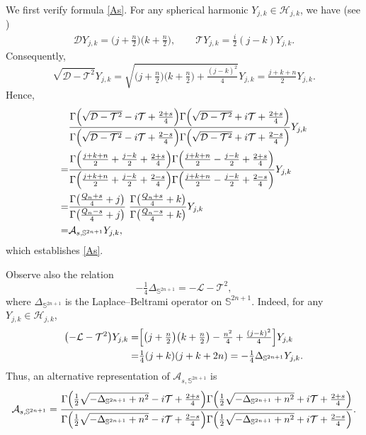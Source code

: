 \documentclass[12pt,reqno]{amsart}%
\theoremstyle{plain}
\numberwithin{equation}{section}
\begin{document}
We first verify formula \eqref{As}. For any spherical harmonic \(Y_{j,k} \in \mathcal{H}_{j,k}\), we have (see \cite{st,br1})
\begin{align*}
\mathcal{D} Y_{j,k} = \bigl(j + \tfrac{n}{2}\bigr)\bigl(k + \tfrac{n}{2}\bigr), \qquad
\mathcal{T} Y_{j,k} = \tfrac{i}{2}(j - k) Y_{j,k}.
\end{align*}
Consequently,
\[
\sqrt{\mathcal{D} - \mathcal{T}^{2}}  Y_{j,k}
= \sqrt{\bigl(j + \tfrac{n}{2}\bigr)\bigl(k + \tfrac{n}{2}\bigr) + \tfrac{(j-k)^{2}}{4}}  Y_{j,k}
= \tfrac{j + k + n}{2}  Y_{j,k}.
\]
Hence,
\begin{align*}
& \frac{\Gamma\Bigl(\sqrt{\mathcal{D} - \mathcal{T}^{2}} - i\mathcal{T} + \tfrac{2+s}{4}\Bigr)
      \Gamma\Bigl(\sqrt{\mathcal{D} - \mathcal{T}^{2}} + i\mathcal{T} + \tfrac{2+s}{4}\Bigr)}
     {\Gamma\Bigl(\sqrt{\mathcal{D} - \mathcal{T}^{2}} - i\mathcal{T} + \tfrac{2-s}{4}\Bigr)
      \Gamma\Bigl(\sqrt{\mathcal{D} - \mathcal{T}^{2}} + i\mathcal{T} + \tfrac{2-s}{4}\Bigr)}  Y_{j,k} \\
=& \frac{\Gamma\Bigl(\tfrac{j+k+n}{2} + \tfrac{j-k}{2} + \tfrac{2+s}{4}\Bigr)
      \Gamma\Bigl(\tfrac{j+k+n}{2} - \tfrac{j-k}{2} + \tfrac{2+s}{4}\Bigr)}
     {\Gamma\Bigl(\tfrac{j+k+n}{2} + \tfrac{j-k}{2} + \tfrac{2-s}{4}\Bigr)
      \Gamma\Bigl(\tfrac{j+k+n}{2} - \tfrac{j-k}{2} + \tfrac{2-s}{4}\Bigr)}  Y_{j,k} \\
=& \frac{\Gamma\bigl(\tfrac{Q_n+s}{4} + j\bigr)}{\Gamma\bigl(\tfrac{Q_n-s}{4} + j\bigr)}\;
   \frac{\Gamma\bigl(\tfrac{Q_n+s}{4} + k\bigr)}{\Gamma\bigl(\tfrac{Q_n-s}{4} + k\bigr)}
   Y_{j,k} \\
=& \mathcal{A}_{s,\mathbb{S}^{2n+1}} Y_{j,k},
\end{align*}
which establishes \eqref{As}.

Observe also the relation
\[
-\tfrac{1}{4}\Delta_{\mathbb{S}^{2n+1}} = -\mathcal{L} - \mathcal{T}^{2},
\]
where \(\Delta_{\mathbb{S}^{2n+1}}\) is the Laplace--Beltrami operator on \(\mathbb{S}^{2n+1}\). Indeed, for any \(Y_{j,k} \in \mathcal{H}_{j,k}\),
\begin{align*}
\bigl(-\mathcal{L} - \mathcal{T}^{2}\bigr) Y_{j,k}
=& \Bigl[\bigl(j + \tfrac{n}{2}\bigr)\bigl(k + \tfrac{n}{2}\bigr) - \tfrac{n^{2}}{4} + \tfrac{(j-k)^{2}}{4}\Bigr] Y_{j,k} \\
=& \tfrac{1}{4}(j+k)(j+k+2n) = -\tfrac{1}{4}\Delta_{\mathbb{S}^{2n+1}} Y_{j,k}.
\end{align*}
Thus, an alternative representation of \(\mathcal{A}_{s,\mathbb{S}^{2n+1}}\) is
\[
\mathcal{A}_{s,\mathbb{S}^{2n+1}} =
\frac{\Gamma\Bigl(\tfrac{1}{2}\sqrt{-\Delta_{\mathbb{S}^{2n+1}}+n^{2}} - i\mathcal{T} + \tfrac{2+s}{4}\Bigr)
      \Gamma\Bigl(\tfrac{1}{2}\sqrt{-\Delta_{\mathbb{S}^{2n+1}}+n^{2}} + i\mathcal{T} + \tfrac{2+s}{4}\Bigr)}
     {\Gamma\Bigl(\tfrac{1}{2}\sqrt{-\Delta_{\mathbb{S}^{2n+1}}+n^{2}} - i\mathcal{T} + \tfrac{2-s}{4}\Bigr)
      \Gamma\Bigl(\tfrac{1}{2}\sqrt{-\Delta_{\mathbb{S}^{2n+1}}+n^{2}} + i\mathcal{T} + \tfrac{2-s}{4}\Bigr)}.
\]
\end{document}
